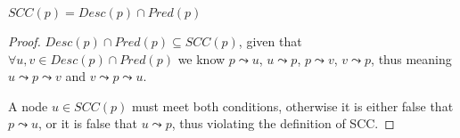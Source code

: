 \begin{theorem} \label{teor:scc}
    $SCC(p)=Desc(p) \cap Pred(p)$
\end{theorem}
\begin{proof}
    $Desc(p) \cap Pred(p) \subseteq SCC(p)$, given that $\forall u, v \in Desc(p) \cap Pred(p)$ we know $p \leadsto u$, $u \leadsto p$, $p \leadsto v$, $v \leadsto p$, thus meaning $u \leadsto p \leadsto v$ and $v \leadsto p \leadsto u$.\par
    A node $u \in SCC(p)$ must meet both conditions, otherwise it is either false that $p \leadsto u$, or it is false that $u \leadsto p$, thus violating the definition of \acrshort{SCC}.
\end{proof}
